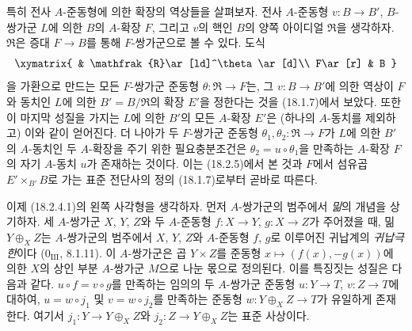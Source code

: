 \begin{env}[18.2.6]
\label{0.18.2.6-fr}
특히 전사 $A$-준동형에 의한 확장의 역상들을 살펴보자. 전사
$A$-준동형 $v:B\to B'$, $B$-쌍가군 $L$에 의한 $B$의 $A$-확장
$F$, 그리고 $v$의 핵인 $B$의 양쪽 아이디얼 $\mathfrak{R}$을
생각하자. $\mathfrak{R}$은 증대 $F\to B$를 통해 $F$-쌍가군으로
볼 수 있다. 도식
\[
  \xymatrix{
    & \mathfrak{R}\ar[ld]^\theta\ar[d]\\
    F\ar[r] & B
  }
\]
을 가환으로 만드는 모든 $F$-쌍가군 준동형
$\theta:\mathfrak{R}\to F$는, 그 $v:B\to B'$에 의한 역상이
$F$와 동치인 $L$에 의한 $B'=B/\mathfrak{R}$의 확장 $E'$을
정한다는 것을 (18.1.7)에서 보았다. 또한 이 마지막 성질을 가지는
$L$에 의한 $B'$의 모든 $A$-확장 $E'$은 (하나의 $A$-동치를
제외하고) 이와 같이 얻어진다. 더 나아가 두 $F$-쌍가군 준동형
$\theta_1,\theta_2:\mathfrak{R}\to F$가 $L$에 의한 $B'$의
$A$-동치인 두 $A$-확장을 주기 위한 필요충분조건은
$\theta_2=u\circ\theta_1$을 만족하는 $A$-확장 $F$의 자기
$A$-동치 $u$가 존재하는 것이다.
이는 (18.2.5)에서 본 것과 $F$에서 섬유곱
$E'\times_{B'}B$로 가는 표준 전단사의 정의 (18.1.7)로부터 곧바로
따른다.
\end{env}

\begin{env}[18.2.7]
\label{0.18.2.7-fr}
이제 (18.2.4.1)의 왼쪽 사각형을 생각하자. 먼저 $A$-쌍가군의
범주에서 \emph{밂}의 개념을 상기하자. 세 $A$-쌍가군
$X$, $Y$, $Z$와 두 $A$-준동형 $f:X\to Y$, $g:X\to Z$가
주어졌을 때, 밂 $Y\oplus_XZ$는 $A$-쌍가군의 범주에서
$X$, $Y$, $Z$와 $A$-준동형 $f$, $g$로 이루어진 귀납계의
\emph{귀납극한}이다 ($0_{\mathrm{III}}$, 8.1.11). 이 $A$-쌍가군은
곱 $Y\times Z$를 준동형
$x\mapsto(f(x),-g(x))$에 의한 $X$의 상인 부분 $A$-쌍가군
$M$으로 나눈 몫으로 정의된다. 이를 특징짓는 성질은 다음과 같다.
$u\circ f=v\circ g$를 만족하는 임의의 두 $A$-쌍가군 준동형
$u:Y\to T$, $v:Z\to T$에 대하여, $u=w\circ j_1$ 및
$v=w\circ j_2$를 만족하는 준동형 $w:Y\oplus_XZ\to T$가
유일하게 존재한다. 여기서
$j_1:Y\to Y\oplus_XZ$와 $j_2:Z\to Y\oplus_XZ$는 표준 사상이다.
\end{env}

